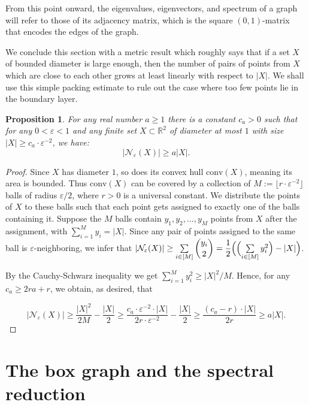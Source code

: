 \documentclass[12pt]{article}
\newtheorem{prop}[thm]{Proposition}
\newcommand{\eps}{\varepsilon}
\begin{document}
From this point onward, the eigenvalues, eigenvectors, and spectrum of a graph will refer to those of its adjacency matrix, which is the square $(0,1)$-matrix that encodes the edges of the graph.

We conclude this section with a metric result which roughly says that if a set $X$ of bounded diameter is large enough, then the number of pairs of points from $X$ which are close to each other grows at least linearly with respect to $|X|$. We shall use this simple packing estimate to rule out the case where too few points lie in the boundary layer.

\begin{prop}\label{prop:many-close-pairs}
    For any real number $a\geq 1$ there is a constant $c_a>0$ such that for any $0<\eps<1$ and any finite set $X\subset \mathbb{R}^2$ of diameter at most $1$ with size $|X|\geq c_a\cdot \varepsilon^{-2}$, we have: 
    $$|\mathcal{N}_\eps(X)|\geq a|X|.$$
\end{prop}

\begin{proof}
    Since $X$ has diameter $1$, so does its convex hull $\text{conv}(X)$, meaning its area is bounded. Thus $\text{conv}(X)$ can be covered by a collection of $M:=\lfloor r\cdot\eps^{-2}\rfloor$ balls of radius $\eps/2$, where $r>0$ is a universal constant. We distribute the points of $X$ to these balls such that each point gets assigned to exactly one of the balls containing it. Suppose the $M$ balls contain $y_1,y_2,\ldots,y_M$ points from $X$ after the assignment, with $\sum_{i=1}^M y_i=|X|$. Since any pair of points assigned to the same ball is $\eps$-neighboring, we infer that ${\left|\mathcal{N}_\eps(X)\right|\geq \sum\limits_{i\in [M]}\dbinom{y_i}{2}= \dfrac{1}{2}\Bigl(\Bigl(\sum\limits_{i\in [M]}y_i^2\Bigr) - |X|\Bigr)}$.

    By the Cauchy-Schwarz inequality we get $\sum_{i=1}^M y_i^2\geq |X|^2/M$. Hence, for any $c_a\geq 2ra+r$, we obtain, as desired, that 
    
    $$\left|\mathcal{N}_\eps(X)\right|\geq\frac{|X|^2}{2M}-\dfrac{|X|}{2}\geq \frac{c_a\cdot\eps^{-2}\cdot |X|}{2r\cdot \eps^{-2}}-\dfrac{|X|}{2}\geq \frac{(c_a-r)\cdot|X|}{2r}\geq a|X|.$$
\end{proof}

\section{The box graph and the spectral reduction}\label{sec:reduction}
\end{document}
